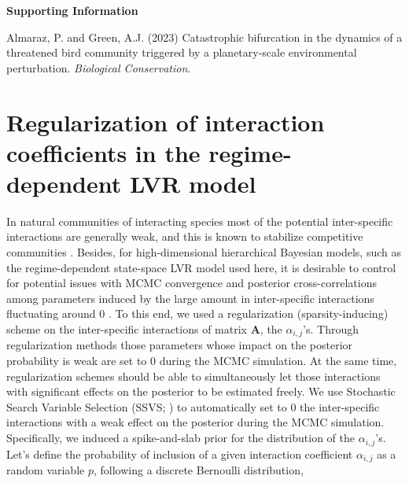\documentclass[11pt]{article}
\begin{document}
\noindent \textbf{\LARGE{Supporting Information}}\\

\vspace{0.2in}

\noindent \large{Almaraz, P. and Green, A.J. (2023) Catastrophic bifurcation in the dynamics of a threatened bird community triggered by a planetary-scale environmental perturbation. \textit{Biological Conservation}.}

\vspace{0.7in}

\def\tightlist{}

\tableofcontents
{}

\newpage

\linenumbers


\section{Regularization of interaction coefficients in the regime-dependent LVR model}

In natural communities of interacting species most of the potential inter-specific interactions are generally weak, and this is known to stabilize competitive communities \cite{McCann1998,Berlow1999,Neutel2008,Mutshinda2009,Barabas2016,Wootton2016,Downing2020,Gellner2023}. Besides, for high-dimensional hierarchical Bayesian models, such as the regime-dependent state-space LVR model used here, it is desirable to control for potential issues with MCMC convergence and posterior cross-correlations among parameters induced by the large amount in inter-specific interactions fluctuating around 0 \cite{Almaraz2011,Almaraz2012,Mutshinda2009,Mutshinda2011}. To this end, we used a regularization (sparsity-inducing) scheme on the inter-specific interactions of matrix $\mathbf{A}$, the $\alpha_{i,j}$'s. Through regularization methods those parameters whose impact on the posterior probability is weak are set to 0 during the MCMC simulation. At the same time, regularization schemes should be able to simultaneously let those interactions with significant effects on the posterior to be estimated freely. We use Stochastic Search Variable Selection (SSVS; \cite{George1993}) to automatically set to 0 the inter-specific interactions with a weak effect on the posterior during the MCMC simulation. Specifically, we induced a spike-and-slab prior \cite{Ishwaran2005} for the distribution of the $\alpha_{i,j}$'s. Let's define the probability of inclusion of a given interaction coefficient $\alpha_{i,j}$ as a random variable $p$, following a discrete Bernoulli distribution,
\end{document}
